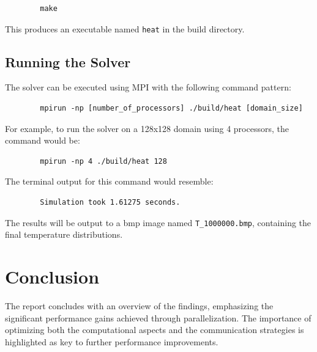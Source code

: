 \documentclass[11pt]{article}
\begin{document}
        \begin{verbatim}
        make
        \end{verbatim}

        This produces an executable named \texttt{heat} in the build directory.

        \subsection{Running the Solver}
        The solver can be executed using MPI with the following command pattern:
        
        \begin{verbatim}
        mpirun -np [number_of_processors] ./build/heat [domain_size]
        \end{verbatim}

        For example, to run the solver on a 128x128 domain using 4 processors, the command would be:
        
        \begin{verbatim}
        mpirun -np 4 ./build/heat 128
        \end{verbatim}

        The terminal output for this command would resemble:
        
        \begin{verbatim}
        Simulation took 1.61275 seconds.
        \end{verbatim}

        The results will be output to a bmp image named \texttt{T\_1000000.bmp}, containing the final temperature distributions.

    \section{Conclusion}
        The report concludes with an overview of the findings, emphasizing the significant performance gains achieved through parallelization. The importance of optimizing both the computational aspects and the communication strategies is highlighted as key to further performance improvements.
\end{document}
